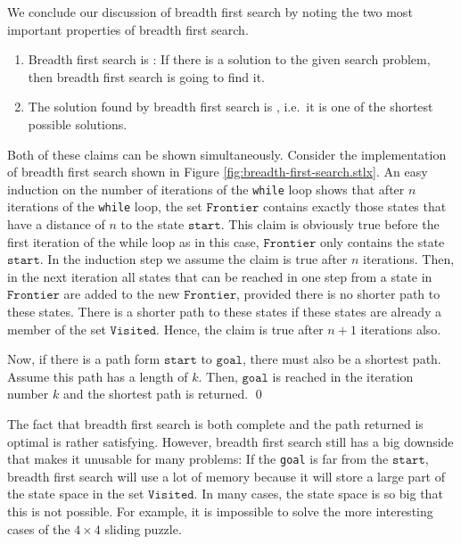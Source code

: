 We conclude our discussion of breadth first search by noting the two most important properties of
breadth first search.
\begin{enumerate}
\item Breadth first search is :  If there is a solution to the given
      search problem, then breadth first search is going to find it.
\item The solution found by breadth first search is , i.e.~it is one of the
      shortest possible solutions.
\end{enumerate}
\proof
Both of these claims can be shown simultaneously.  Consider the implementation of breadth first
search shown in Figure \ref{fig:breadth-first-search.stlx}.  An easy induction on the number of
iterations of the \texttt{while} loop shows that after $n$ iterations of the \texttt{while} loop,
the set $\mathtt{Frontier}$ contains exactly those states that have a distance of $n$ to the state 
$\mathtt{start}$.  This claim is obviously true before the first iteration of the while loop as in
this case, $\mathtt{Frontier}$ only contains the state $\mathtt{start}$.  In the induction step we
assume the claim is true after $n$ iterations.  Then, in the next iteration all states that can be
reached in one step from a state in $\mathtt{Frontier}$ are added to the new $\mathtt{Frontier}$,
provided there is no shorter path to these states.  There is a shorter path to these states if these
states are already a member of the set $\mathtt{Visited}$.  Hence, the claim is true after $n+1$
iterations also.

Now, if there is a path form $\mathtt{start}$ to $\mathtt{goal}$, there must also be a shortest
path.  Assume this path has a length of $k$.  Then, $\mathtt{goal}$ is reached in the iteration
number $k$ and the shortest path is returned.
\qed

The fact that breadth first search is both complete and the path returned is optimal is rather
satisfying.  However, breadth first search still has a big downside that makes it unusable for
many problems:  If the \texttt{goal} is far from the $\mathtt{start}$, breadth first search will use
a lot of memory because it will store a large part of the state space in the set
$\mathtt{Visited}$.  In many cases, the state space is so big that this is not possible.  For example, it is
impossible to solve the more interesting cases of the $4 \times 4$ sliding puzzle.
\pagebreak


